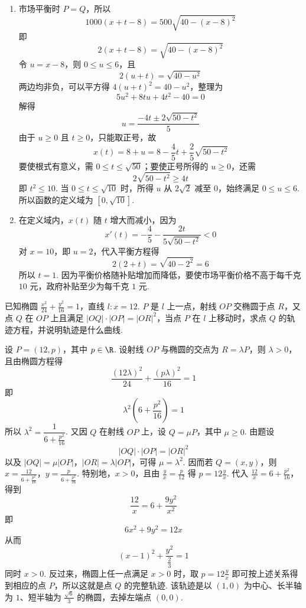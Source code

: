 \begin{solution}
\begin{enumerate}
\item 市场平衡时 \(P=Q\)，所以
\[
1000(x+t-8)=500\sqrt{40-(x-8)^2}
\]
即
\[
2(x+t-8)=\sqrt{40-(x-8)^2}
\]
令 \(u=x-8\)，则 \(0\leqslant u\leqslant6\)，且
\[
2(u+t)=\sqrt{40-u^2}
\]
两边均非负，可以平方得 \(4(u+t)^2=40-u^2\)，整理为
\[
5u^2+8tu+4t^2-40=0
\]
解得
\[
u=\frac{-4t\pm2\sqrt{50-t^2}}{5}
\]
由于 \(u\geqslant0\) 且 \(t\geqslant0\)，只能取正号，故
\[
x(t)=8+u=8-\frac45t+\frac25\sqrt{50-t^2}
\]
要使根式有意义，需 \(0\leqslant t\leqslant\sqrt{50}\)；要使正号所得的 \(u\geqslant0\)，还需
\[
2\sqrt{50-t^2}\geqslant4t
\]
即 \(t^2\leqslant10\). 当 \(0\leqslant t\leqslant\sqrt{10}\) 时，所得 \(u\) 从 \(2\sqrt{2}\) 减至 \(0\)，始终满足 \(0\leqslant u\leqslant6\). 所以函数的定义域为 \([0,\sqrt{10}]\).

\item 在定义域内，\(x(t)\) 随 \(t\) 增大而减小，因为
\[
x'(t)=-\frac45-\frac{2t}{5\sqrt{50-t^2}}<0
\]
对 \(x=10\)，即 \(u=2\)，代入平衡方程得
\[
2(2+t)=\sqrt{40-2^2}=6
\]
所以 \(t=1\). 因为平衡价格随补贴增加而降低，要使市场平衡价格不高于每千克 \(10\text{ 元}\)，政府补贴至少为每千克 \(1\text{ 元}\).
\end{enumerate}
\end{solution}

\begin{problem}
已知椭圆 \(\frac{x^2}{24} + \frac{y^2}{16} = 1\)，直线 \(l: x = 12\). \(P\) 是 \(l\) 上一点，射线 \(OP\) 交椭圆于点 \(R\)，又点 \(Q\) 在 \(OP\) 上且满足 \(|OQ| \cdot |OP| = |OR|^2\)，当点 \(P\) 在 \(l\) 上移动时，求点 \(Q\) 的轨迹方程，并说明轨迹是什么曲线.
\end{problem}

\begin{solution}
设 \(P=(12,p)\)，其中 \(p\in\R\). 设射线 \(OP\) 与椭圆的交点为 \(R=\lambda P\)，则 \(\lambda>0\)，且由椭圆方程得
\[
\frac{(12\lambda)^2}{24}+\frac{(p\lambda)^2}{16}=1
\]
即
\[
\lambda^2\left(6+\frac{p^2}{16}\right)=1
\]
所以 \(\lambda^2=\dfrac{1}{6+\frac{p^2}{16}}\). 又因 \(Q\) 在射线 \(OP\) 上，设 \(Q=\mu P\)，其中 \(\mu\geqslant0\). 由题设
\[
|OQ|\cdot|OP|=|OR|^2
\]
以及 \(|OQ|=\mu|OP|\)，\(|OR|=\lambda|OP|\)，可得 \(\mu=\lambda^2\). 因而若 \(Q=(x,y)\)，则 \(x=\frac{12}{6+\frac{p^2}{16}}\)，\(y=\frac{p}{6+\frac{p^2}{16}}\).
特别地，\(x>0\)，且由 \(\frac{y}{x}=\frac{p}{12}\) 得 \(p=12\frac{y}{x}\). 代入 \(\frac{12}{x}=6+\frac{p^2}{16}\)，得到
\[
\frac{12}{x}=6+\frac{9y^2}{x^2}
\]
即
\[
6x^2+9y^2=12x
\]
从而
\[
(x-1)^2+\frac{y^2}{\frac23}=1
\]
同时 \(x>0\).
反过来，椭圆上任一点满足 \(x>0\) 时，取 \(p=12\frac{y}{x}\) 即可按上述关系得到相应的点 \(P\)，所以这就是点 \(Q\) 的完整轨迹. 该轨迹是以 \((1,0)\) 为中心、长半轴为 \(1\)、短半轴为 \(\frac{\sqrt{6}}{3}\) 的椭圆，去掉左端点 \((0,0)\).
\end{solution}
